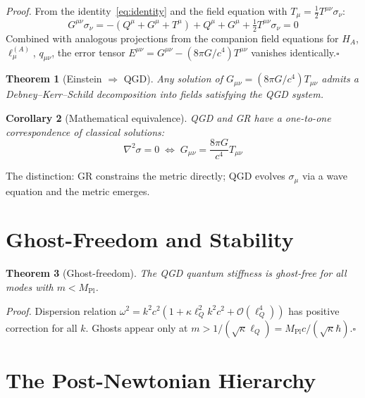 \documentclass[11pt,a4paper]{article}
\theoremstyle{plain}
\newtheorem{theorem}{Theorem}[section]
\newtheorem{corollary}[theorem]{Corollary}
\theoremstyle{definition}
\theoremstyle{remark}
\newcommand{\lQ}{\ell_Q}
\newcommand{\Mpl}{M_{\mathrm{Pl}}}
\begin{document}
\emph{Proof.}  From the identity~\eqref{eq:identity} and the field equation with $T_\mu = \tfrac{1}{2}T^{\mu\nu}\sigma_\nu$:
\begin{equation}
  G^{\mu\nu}\sigma_\nu = -(Q^\mu + G^\mu + T^\mu) + Q^\mu + G^\mu + \tfrac{1}{2}T^{\mu\nu}\sigma_\nu = 0
\end{equation}
Combined with analogous projections from the companion field equations for $H_A$, $\ell_\mu^{(A)}$, $q_{\mu\nu}$, the error tensor $E^{\mu\nu} = G^{\mu\nu} - (8\pi G/c^4)T^{\mu\nu}$ vanishes identically.\hfill$\square$

\begin{theorem}[Einstein $\Rightarrow$ QGD]\label{thm:reverse}
  Any solution of $G_{\mu\nu} = (8\pi G/c^4)T_{\mu\nu}$ admits a Debney--Kerr--Schild decomposition into fields satisfying the QGD system.
\end{theorem}

\begin{corollary}[Mathematical equivalence]\label{cor:equiv}
  QGD and GR have a one-to-one correspondence of classical solutions:
  \begin{equation}
    \nabla^2\sigma = 0 \;\Longleftrightarrow\; G_{\mu\nu} = \frac{8\pi G}{c^4}T_{\mu\nu}
  \end{equation}
\end{corollary}

The distinction: GR constrains the metric directly; QGD evolves $\sigma_\mu$ via a wave equation and the metric emerges.

\section{Ghost-Freedom and Stability}
\label{sec:ghosts}

\begin{theorem}[Ghost-freedom]\label{thm:ghost}
  The QGD quantum stiffness is ghost-free for all modes with $m < \Mpl$.
\end{theorem}

\emph{Proof.}  Dispersion relation $\omega^2 = k^2c^2(1 + \kappa\lQ^2 k^2c^2 + \mathcal{O}(\lQ^4))$ has positive correction for all $k$.  Ghosts appear only at $m > 1/(\sqrt{\kappa}\lQ) = \Mpl c/(\sqrt{\kappa}\hbar)$.\hfill$\square$

\section{The Post-Newtonian Hierarchy}
\label{sec:pn}
\end{document}
